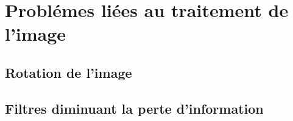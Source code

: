 \chapter{ Probl\'emes li\'ees au traitement de l'image }
\section{ Rotation de l'image}
\section{ Filtres diminuant la perte d'information}






